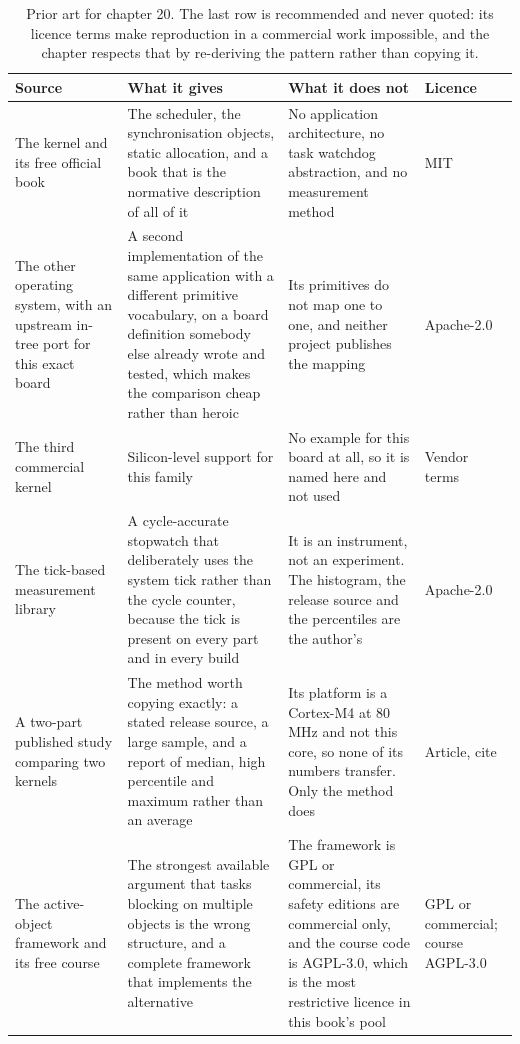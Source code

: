 \begin{table}[H]\centering\small
\begin{tabular}{p{34mm}p{46mm}p{38mm}p{20mm}}
\toprule
Source & What it gives & What it does not & Licence \\
\midrule
The kernel and its free official book & The scheduler, the synchronisation objects, static allocation, and a book that is the normative description of all of it & No application architecture, no task watchdog abstraction, and no measurement method & MIT \\
The other operating system, with an upstream in-tree port for this exact board & A second implementation of the same application with a different primitive vocabulary, on a board definition somebody else already wrote and tested, which makes the comparison cheap rather than heroic & Its primitives do not map one to one, and neither project publishes the mapping & Apache-2.0 \\
The third commercial kernel & Silicon-level support for this family & No example for this board at all, so it is named here and not used & Vendor terms \\
The tick-based measurement library & A cycle-accurate stopwatch that deliberately uses the system tick rather than the cycle counter, because the tick is present on every part and in every build & It is an instrument, not an experiment. The histogram, the release source and the percentiles are the author's & Apache-2.0 \\
A two-part published study comparing two kernels & The method worth copying exactly: a stated release source, a large sample, and a report of median, high percentile and maximum rather than an average & Its platform is a Cortex-M4 at 80 MHz and not this core, so none of its numbers transfer. Only the method does & Article, cite \\
The active-object framework and its free course & The strongest available argument that tasks blocking on multiple objects is the wrong structure, and a complete framework that implements the alternative & The framework is GPL or commercial, its safety editions are commercial only, and the course code is AGPL-3.0, which is the most restrictive licence in this book's pool & GPL or commercial; course AGPL-3.0 \\
\bottomrule
\end{tabular}
\caption{Prior art for chapter 20. The last row is recommended and never quoted: its licence terms make reproduction in a commercial work impossible, and the chapter respects that by re-deriving the pattern rather than copying it.}
\end{table}

